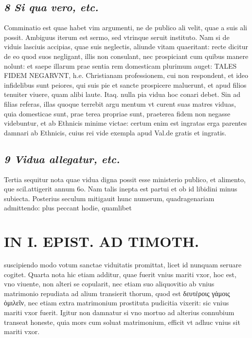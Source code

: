 \documentclass{article}
\begin{document}
\begin{pages}
\subsection*{\textit{8 Si qua vero, etc. }}\pstart Comminatio est quae habet vim argumenti, ne de publico ali velit, quae a suis ali possit. Ambiguus iterum est sermo, sed vtrinque seruit instituto. Nam si de viduis lasciuis accipias, quae suis neglectis, aliunde vitam quaeritant: recte dicitur de eo quod suos negligant, illis non consulant, nec prospiciant cum quibus  manere nolunt: et saepe illarum prae sentia rem domesticam plurimum auget: TALES FIDEM NEGARVNT, h.e. Christianam professionem, cui non respondent, et ideo infidelibus sunt peiores, qui suis pie et sancte prospicere maluerunt, et apud filios tenuiter viuere, quam alibi laute. Itaq. nulla pia vidua hoc conari debet. Sin ad filias referas, illas quoque terrebit argu mentum vt curent suas matres viduas, quia domesticae sunt, prae terea propriae sunt, praeterea fidem non negasse videbuntur, et ab Ethnicis minime victae: certum enim est ingratas erga parentes damnari ab Ethnicis, cuius rei vide exempla apud Val.de gratis et ingratis.  \pend
{}
{}
\subsection*{\textit{9 Vidua allegatur, etc. }}\pstart Tertia sequitur nota quae vidua digna possit esse ministerio publico, et alimento, que scil.attigerit annum 6o. Nam talis inepta est partui et ob id libidini minus subiecta. Posterius seculum mitigauit hunc numerum, quadragenariam admittendo: plus peccant hodie, quamlibet  \pend
\section*{IN I. EPIST. AD TIMOTH. }
\marginpar{[ p.127 ]}\pstart suscipiendo modo votum sanctae viduitatis promittat, licet id nunquam seruare cogitet.  \pend\pstart Quarta nota hic etiam additur, quae fuerit vnius mariti vxor, hoc est, vno viuente, non alteri se copularit, nec etiam suo aliquovitio ab vnius matrimonio repudiata ad alium transierit thorum, quod est δευτέροις γάμοις ὁμιλεῖν, nec etiam extra matrimonium prostituta pudicitia vixerit: sic vnius mariti vxor fuerit. Igitur non damnatur si vno mortuo ad alterius connubium transeat honeste, quia mors cum soluat matrimonium, efficit vt adhuc vnius sit mariti vxor.  \pend
{}
{}

\end{pages}
\end{document}
